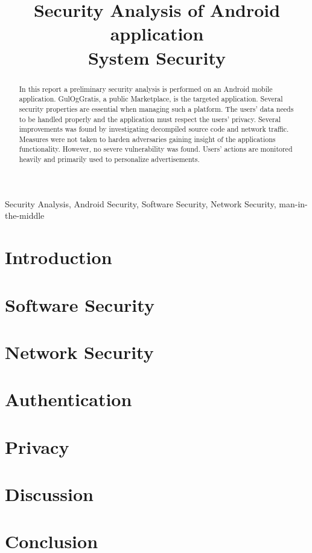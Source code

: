 \documentclass[conference]{IEEEtran}
\begin{document}
\title{Security Analysis of Android application\\
{\footnotesize System Security}}

\author{
}

\maketitle

\begin{abstract}
In this report a preliminary security analysis is performed on an Android mobile application. GulOgGratis, a public Marketplace, is the targeted application. Several security properties are essential when managing such a platform. The users' data needs to be handled properly and the application must respect the users' privacy. Several improvements was found by investigating decompiled source code and network traffic. Measures were not taken to harden adversaries gaining insight of the applications functionality. However, no severe vulnerability was found. Users' actions are monitored heavily and primarily used to personalize advertisements.
\end{abstract}

\begin{IEEEkeywords}
Security Analysis, Android Security, Software Security, Network Security, man-in-the-middle
\end{IEEEkeywords}

\section{Introduction}


\newpage
\section{Software Security}


\section{Network Security}


\section{Authentication}


\section{Privacy}


\section{Discussion}


\section{Conclusion}


\printbibliography
\end{document}
